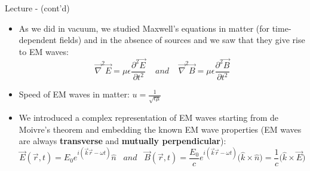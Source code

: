 %
%
%

\begin{frame}{Lecture \summarizedlecture - \lecturesummarytitle (cont'd)}

\begin{itemize}

\item As we did in vacuum, we studied Maxwell's equations in matter (for time-dependent fields)
          and in the absence of sources and we saw that they give rise to EM waves:
          \begin{equation*}
             \vec{\nabla}^{2} \vec{E} = \mu \epsilon \frac{\partial^{2} \vec{E}}{\partial t^{2}} \;\;\;\; and \;\;\;\;
             \vec{\nabla}^{2} \vec{B} = \mu \epsilon \frac{\partial^{2} \vec{B}}{\partial t^{2}}
         \end{equation*}

\item Speed of EM waves in matter: $\displaystyle u = \frac{1}{\sqrt{\epsilon \mu}}$

\item We introduced a complex representation of EM waves starting from de Moivre's theorem
          and embedding the known EM wave properties (EM waves are always {\bf transverse} and
          {\bf mutually perpendicular}):
          \begin{equation*}
                \vec{E}(\vec{r},t) = E_0  e^{i (\vec{k} \vec{r} -\omega t)} \hat{n}
                 \;\;\; and \;\;\;
                \vec{B}(\vec{r},t) =
                  \frac{E_0}{c}  e^{i ( \vec{k} \vec{r} -\omega t)} \Big( \hat{k} \times \hat{n} \Big) =
                  \frac{1}{c}  \Big( \hat{k} \times \vec{E} \Big)
          \end{equation*}

\end{itemize}

\end{frame}

%
%
%

